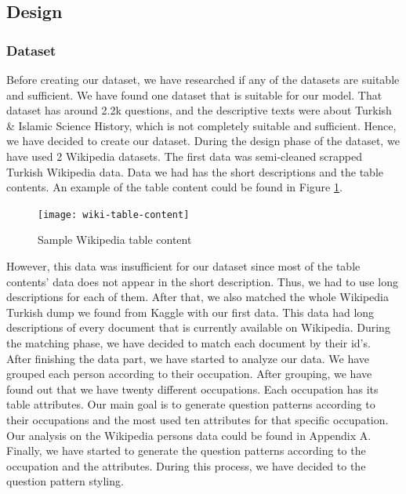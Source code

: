 \documentclass{mefsdp}
\begin{document}
	\subsection{Design}
	\subsubsection{Dataset}\label{dataset-design}
	Before creating our dataset, we have researched if any of the datasets are suitable and sufficient. We have found one dataset that is suitable for our model. That dataset has around 2.2k questions, and the descriptive texts were about Turkish \& Islamic Science History, which is not completely suitable and sufficient. Hence, we have decided to create our dataset. During the design phase of the dataset, we have used 2 Wikipedia datasets. The first data was semi-cleaned scrapped Turkish Wikipedia data. Data we had has the short descriptions and the table contents. An example of the table content could be found in Figure \ref{wiki-table-content}. 
	\begin{figure}[h!]
		\centering
		\texttt{[image: wiki-table-content]}
		\caption{Sample Wikipedia table content\label{wiki-table-content}}
	\end{figure}
	
	However, this data was insufficient for our dataset since most of the table contents' data does not appear in the short description. Thus, we had to use long descriptions for each of them. After that, we also matched the whole Wikipedia Turkish dump we found from Kaggle with our first data. This data had long descriptions of every document that is currently available on Wikipedia. During the matching phase, we have decided to match each document by their id's.\\
	
	After finishing the data part, we have started to analyze our data. We have grouped each person according to their occupation. After grouping, we have found out that we have twenty different occupations. Each occupation has its table attributes. Our main goal is to generate question patterns according to their occupations and the most used ten attributes for that specific occupation. Our analysis on the Wikipedia persons data could be found in Appendix A.\\
	
	Finally, we have started to generate the question patterns according to the occupation and the attributes. During this process, we have decided to the question pattern styling.\\
	
\end{document}
